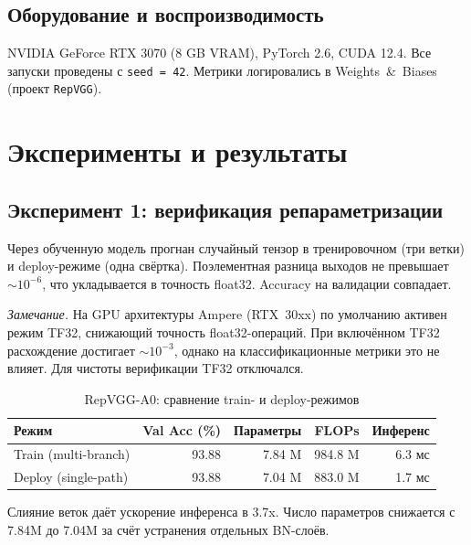 \documentclass[12pt,a4paper]{article}
\newcommand{\repvggAcc}{93.88}
\newcommand{\repvggParams}{7.84}
\newcommand{\repvggDeployParams}{7.04}
\newcommand{\repvggFlops}{984.8}
\newcommand{\repvggDeployFlops}{883.0}
\newcommand{\repvggInfTrain}{6.3}
\newcommand{\repvggInfDeploy}{1.7}
\newcommand{\repvggSpeedup}{3.7}
\begin{document}
\subsection{Оборудование и воспроизводимость}

NVIDIA GeForce RTX 3070 (8 GB VRAM), PyTorch 2.6, CUDA 12.4. Все запуски проведены с \texttt{seed\,=\,42}. Метрики логировались в Weights~\&~Biases (проект \texttt{RepVGG}).


\section{Эксперименты и результаты}

\subsection{Эксперимент 1: верификация репараметризации}

Через обученную модель прогнан случайный тензор в тренировочном (три ветки) и deploy-режиме (одна свёртка). Поэлементная разница выходов не превышает $\sim\!10^{-6}$, что укладывается в точность float32. Accuracy на валидации совпадает.

\textit{Замечание.} На GPU архитектуры Ampere (RTX~30xx) по умолчанию активен режим TF32, снижающий точность float32-операций. При включённом TF32 расхождение достигает $\sim\!10^{-3}$, однако на классификационные метрики это не влияет. Для чистоты верификации TF32 отключался.

\begin{table}[H]
\centering
\caption{RepVGG-A0: сравнение train- и deploy-режимов}
\label{tab:reparam}
\begin{tabular}{@{}lrrrr@{}}
\toprule
Режим & Val Acc (\%) & Параметры & FLOPs & Инференс \\
\midrule
Train (multi-branch) & \repvggAcc{} & \repvggParams{} M & \repvggFlops{} M & \repvggInfTrain{} мс \\
Deploy (single-path) & \repvggAcc{} & \repvggDeployParams{} M & \repvggDeployFlops{} M & \repvggInfDeploy{} мс \\
\bottomrule
\end{tabular}
\end{table}

Слияние веток даёт ускорение инференса в \repvggSpeedup{}x. Число параметров снижается с \repvggParams{}M до \repvggDeployParams{}M за счёт устранения отдельных BN-слоёв.
\end{document}
